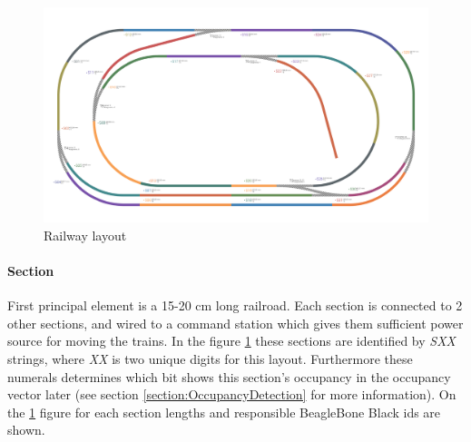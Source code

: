 \begin{figure}[h]
	\centering
	\includegraphics[width=150mm, keepaspectratio]{figures/modes3/layout2.png}
	\caption{Railway layout}
	\label{fig:layout}
\end{figure}

\paragraph{Section} 
First principal  element is a 15-20 cm long railroad. Each section is connected to 2 other sections, and wired to a command station which gives them sufficient power source for moving the trains. In the figure \ref{fig:layout} these sections are identified by \textit{SXX} strings, where \textit{XX} is two unique digits for this layout. Furthermore these numerals determines which bit shows this section's occupancy in the occupancy vector later (see section \ref{section:OccupancyDetection} for more information). On the \ref{fig:layout} figure for each section lengths and responsible BeagleBone Black ids are shown.

